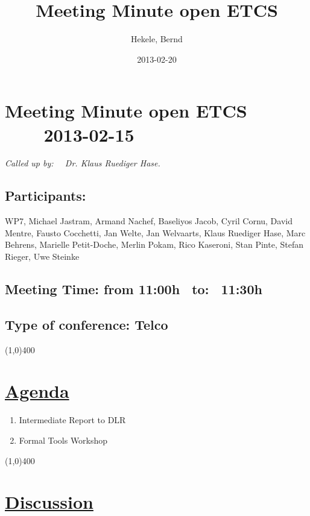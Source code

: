 \documentclass[a4paper]{article}
\title{Meeting Minute open ETCS}
\author{Hekele, Bernd}
\date{2013-02-20}
\begin{document}
\section*{\large{Meeting Minute open ETCS \ \ \ \ 2013-02-15}}

\large{\emph{Called up by: \ \  Dr. Klaus Ruediger Hase.}}

\subsection*{Participants:} WP7, Michael Jastram, Armand Nachef, Baseliyos Jacob, Cyril Cornu, David Mentre, Fausto Cocchetti, Jan Welte, Jan Welvaarts, Klaus Ruediger Hase, Marc Behrens, Marielle Petit-Doche, Merlin Pokam, Rico Kaseroni, Stan Pinte, Stefan Rieger, Uwe Steinke\\

\subsection*{Meeting Time: from 11:00h \ to: \ 11:30h}

\subsection*{Type of conference: Telco}

\line(1,0){400}
\section*{\underline{Agenda}}
\begin{enumerate}
\item Intermediate Report to DLR
\item Formal Tools Workshop
\end{enumerate}
\line(1,0){400}
\section*{\underline{Discussion}}
\end{document}
